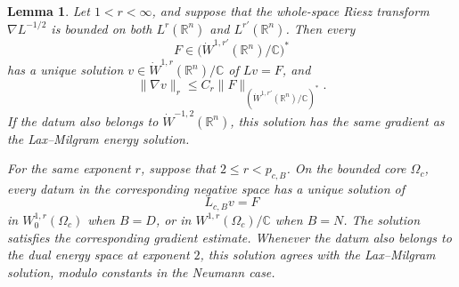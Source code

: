 \documentclass[12pt]{amsart}
\newtheorem{lemma}[theorem]{Lemma}
\theoremstyle{remark}
\begin{document}
\begin{lemma}
\label{lem:homogeneous-model-inverses}
Let \(1<r<\infty\), and suppose that the whole-space Riesz transform
\(\nabla L^{-1/2}\) is bounded on both \(L^r(\mathbb R^n)\) and
\(L^{r'}(\mathbb R^n)\).  Then every
\[
 F\in\bigl(\dot W^{1,r'}(\mathbb R^n)/\mathbb C\bigr)^*
\]
has a unique solution \(v\in\dot W^{1,r}(\mathbb R^n)/\mathbb C\) of
\(Lv=F\), and
\begin{equation}\label{eq:model-zero-inverse}
 \|\nabla v\|_r\leq C_r
 \|F\|_{(\dot W^{1,r'}(\mathbb R^n)/\mathbb C)^*}.
\end{equation}
If the datum also belongs to
\(\dot W^{-1,2}(\mathbb R^n)\), this solution has the same gradient as
the Lax--Milgram energy solution.

For the same exponent \(r\), suppose that \(2\leq r<p_{c,B}\).  On the
bounded core $\Omega_c$, every datum in the corresponding negative space has a unique solution of
\[
 L_{c,B}v=F
\]
in \(W^{1,r}_0(\Omega_c)\) when \(B=D\), or in
\(W^{1,r}(\Omega_c)/\mathbb C\) when \(B=N\). The solution satisfies the corresponding gradient estimate. Whenever the datum also belongs to the dual energy space at exponent \(2\), this solution agrees with the Lax--Milgram solution, modulo constants in the Neumann case.
\end{lemma}
\end{document}
